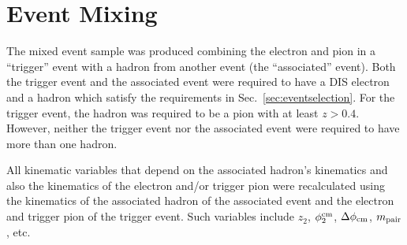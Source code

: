 \section{Event Mixing}
The mixed event sample was produced combining the electron and pion in a ``trigger'' event with a hadron from another event (the ``associated'' event).  Both the trigger event and the associated event were required to have a DIS electron and a hadron which satisfy the requirements in Sec.~\ref{sec:eventselection}.  For the trigger event, the hadron was required to be a pion with at least $z>0.4$. However, neither the trigger event nor the associated event were required to have more than one hadron.  


All kinematic variables that depend on the associated hadron's kinematics and also the kinematics of the electron and/or trigger pion were recalculated using the kinematics of the associated hadron of the associated event and the electron and trigger pion of the trigger event.  Such variables include $z_2$, $\phi^{\rm cm}_2$, $\Delta\phi_{\rm cm}$, $m_{\rm pair}$, etc.  



